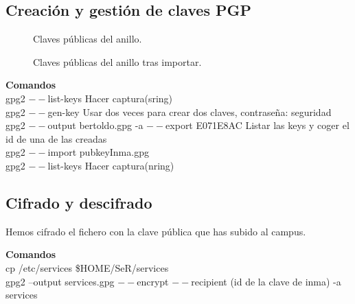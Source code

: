\documentclass[11pt]{article}
\begin{document}
    \subsection{Creación y gestión de claves PGP}
      \begin{figure}[!ht]
        \centering
        \caption{Claves públicas del anillo.}
      \end{figure}

      \begin{figure}[!ht]
        \centering
        \caption{Claves públicas del anillo tras importar.}
      \end{figure}

      \par
      \textbf{Comandos}\\
      gpg2 $--$list-keys \hspace{10mm} Hacer captura(sring)\\
      \vspace{2mm}
      gpg2 $--$gen-key \hspace{10mm} Usar dos veces para crear dos claves, contraseña: seguridad\\
      gpg2 $--$output bertoldo.gpg -a $--$export E071E8AC \hspace{10mm} Listar las keys y coger el id de una de las creadas\\
      \vspace{2mm}
      gpg2 $--$import pubkeyInma.gpg\\
      gpg2 $--$list-keys \hspace{10mm} Hacer captura(nring)\\

    \subsection{Cifrado y descifrado}
      \par
      Hemos cifrado el fichero con la clave pública que has subido al campus.

      \par
      \textbf{Comandos}\\
      cp /etc/services \$HOME/SeR/services\\
      gpg2 --output services.gpg $--$encrypt $--$recipient (id de la clave de inma) -a services
\end{document}
